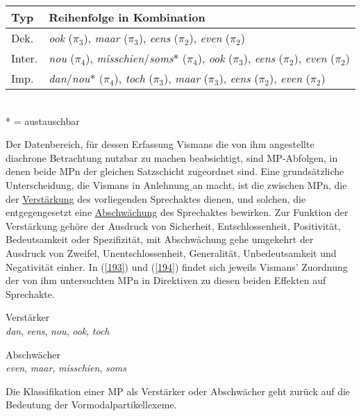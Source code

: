 \begin{exe}
	\ex\label{192}
	\scriptsize
	\begin{tabular}[t]{|l|l|}
	\hline
  	Typ & Reihenfolge in Kombination\\
  	\hline
  	Dek. & \textit{ook} ($\pi_{3}$), \textit{maar} ($\pi_{3}$), \textit{eens} ($\pi_{2}$), \textit{even} ($\pi_{2}$)\\
  	\hline
  	Inter. & \textit{nou} ($\pi_{4}$), \textit{misschien}/\textit{soms}* ($\pi_{4}$), \textit{ook} ($\pi_{3}$), \textit{eens} ($\pi_{2}$), 			\textit{even} ($\pi_{2}$)\\
  	\hline 
  	Imp. & \textit{dan}/\textit{nou}* ($\pi_{4}$), \textit{toch} ($\pi_{3}$), \textit{maar} ($\pi_{3}$), \textit{eens} ($\pi_{2}$), \textit{even} ($\pi_{2}$)\\
  	\hline
\end{tabular}\\
* = austauschbar
\end{exe}
Der Datenbereich, für dessen Erfassung Vismans die von ihm angestellte dia\-chrone  Betrachtung nutzbar zu machen beabsichtigt, sind MP-Abfolgen, in denen beide MPn der gleichen Satzschicht zugeordnet sind. Eine grundsätzliche Unterscheidung, die Vismans in Anlehnung an \citet{Hengeveld1989} macht, ist die zwischen MPn, die der \underline{Verstärkung} des vorliegenden Sprechaktes  dienen, und solchen, die entgegengesetzt eine \underline{Abschwächung} des Sprechaktes bewirken. Zur Funktion der Verstärkung gehöre der Ausdruck von Sicherheit, Entschlossenheit, Positivität, Bedeutsamkeit oder Spezifizität, mit Abschwächung gehe umgekehrt der Ausdruck von Zweifel, Unentschlossenheit, Generalität, Unbedeutsamkeit und Negativität einher. In (\ref{193}) und (\ref{194}) findet sich jeweils Vismans' Zuordnung der von ihm untersuchten MPn in Direktiven  zu diesen beiden Effekten auf Sprechakte.
		
\begin{exe}
	\ex\label{193} 
	Verstärker\\
	\textit{dan}, \textit{eens}, \textit{nou}, \textit{ook}, \textit{toch}
\end{exe}		
	
\begin{exe}
	\ex\label{194} 
	Abschwächer\\
	\textit{even}, \textit{maar}, \textit{misschien}, \textit{soms}
	\hfill\hbox {\citet[73]{Vismans1994}}
\end{exe}		
Die Klassifikation einer MP als Verstärker oder Abschwächer geht zurück auf die Bedeutung  der Vormodalpartikellexeme. 

